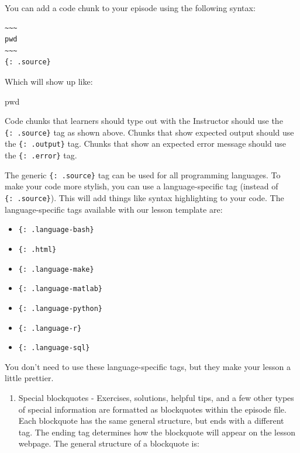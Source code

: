 \documentclass[]{book}
\newenvironment{Shaded}{\begin{snugshade}}{\end{snugshade}}
\newcommand{\BuiltInTok}[1]{#1}
\providecommand{\tightlist}{%
  \setlength{\itemsep}{0pt}\setlength{\parskip}{0pt}}
\begin{document}
You can add a code chunk to your episode using the following syntax:

\begin{verbatim}
~~~
pwd
~~~
{: .source}
\end{verbatim}

Which will show up like:

\begin{Shaded}
\begin{Highlighting}[]
\BuiltInTok{pwd}
\end{Highlighting}
\end{Shaded}

Code chunks that learners should type out with the Instructor should use the \texttt{\{:\ .source\}} tag as shown above.
Chunks that show expected output should use the \texttt{\{:\ .output\}} tag. Chunks that show an expected error
message should use the \texttt{\{:\ .error\}} tag.

The generic \texttt{\{:\ .source\}} tag can be used for all programming languages. To make your code more stylish,
you can use a language-specific tag (instead of \texttt{\{:\ .source\}}). This will add things like syntax highlighting
to your code. The language-specific tags available with our lesson template are:

\begin{itemize}
\tightlist
\item
  \texttt{\{:\ .language-bash\}}
\item
  \texttt{\{:\ .html\}}
\item
  \texttt{\{:\ .language-make\}}
\item
  \texttt{\{:\ .language-matlab\}}
\item
  \texttt{\{:\ .language-python\}}
\item
  \texttt{\{:\ .language-r\}}
\item
  \texttt{\{:\ .language-sql\}}
\end{itemize}

You don't need to use these language-specific tags, but they make your lesson a little prettier.

\begin{enumerate}
\def\labelenumi{\arabic{enumi}.}
\tightlist
\item
  Special blockquotes - Exercises, solutions, helpful tips, and a few other types of special information are
  formatted as blockquotes within the episode file. Each blockquote has the same general structure, but ends
  with a different tag. The ending tag determines how the blockquote will appear on the lesson webpage. The
  general structure of a blockquote is:
\end{enumerate}
\end{document}
